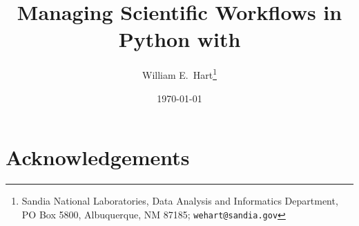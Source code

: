 \documentclass[12pt]{article}
\begin{document}
\title{Managing Scientific Workflows in Python with }

\author{William E.\ Hart\footnote{Sandia National Laboratories, 
Data Analysis and Informatics Department, 
PO Box 5800, Albuquerque, NM 87185;
{\tt wehart@sandia.gov}}
}

\date{\today}

\maketitle

\begin{abstract}

\end{abstract}


\lstset{language=Python}
\lstset{aboveskip=1em,belowskip=1em,showspaces=false,showstringspaces=false}

\newpage





\section*{Acknowledgements} 






\end{document}
